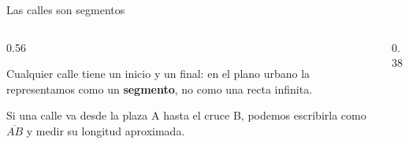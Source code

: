 \documentclass[aspectratio=169, 10pt, spanish]{beamer}
\begin{document}
\begin{frame}{Las calles son segmentos}
  \begin{columns}[c]
    \begin{column}{0.56\textwidth}
      \begin{notabox}
        \AlmFontSmall
        Cualquier calle tiene un inicio y un final:
        en el plano urbano la representamos como un
        \textbf{segmento}, no como una recta infinita.
      \end{notabox}
      \vspace{8pt}
      \begin{ejemplobox}
        \AlmFontFootnote
        Si una calle va desde la plaza A hasta el cruce B,
        podemos escribirla como $\overline{AB}$ y medir
        su longitud aproximada.
      \end{ejemplobox}
    \end{column}
    \begin{column}{0.38\textwidth}
      \begin{center}
      \end{center}
    \end{column}
  \end{columns}
\end{frame}

\end{document}
